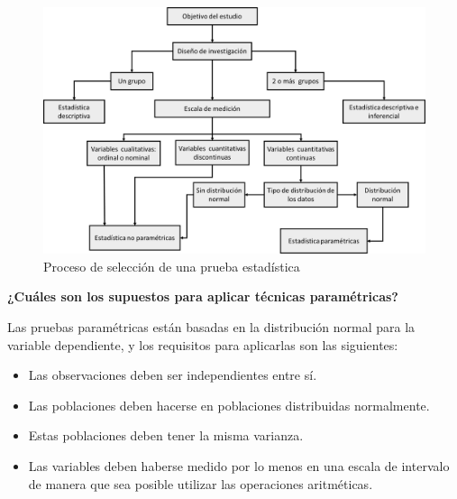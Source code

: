 \documentclass{article}
\begin{document}
\begin{figure}
\centering
\includegraphics[scale=0.5]{Figures/resumenguia.png}
\caption{Proceso de selección de una prueba estadística}
\label{guia}
\end{figure}
 
\noindent \textbf{¿Cuáles son los supuestos para aplicar técnicas paramétricas?}
    
Las pruebas paramétricas están basadas en la distribución normal para la variable dependiente, y los requisitos para aplicarlas son las siguientes:
    
\begin{itemize}
    \item Las observaciones deben ser independientes entre sí.
    \item Las poblaciones deben hacerse en poblaciones distribuidas normalmente.
    \item Estas poblaciones deben tener la misma varianza.
    \item Las variables deben haberse medido por lo menos en una escala de intervalo de manera que sea posible utilizar las operaciones aritméticas.
\end{itemize}



\end{document}
